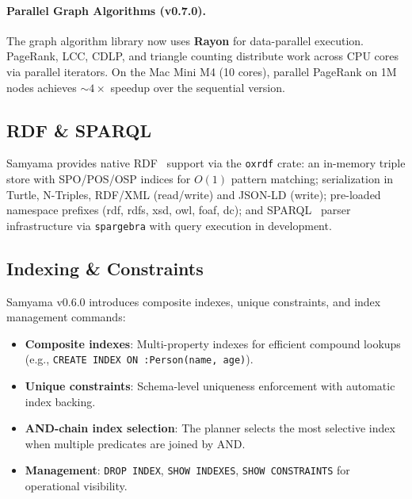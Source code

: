 \documentclass[11pt]{article}
\begin{document}
\paragraph{Parallel Graph Algorithms (v0.7.0).}
The graph algorithm library now uses \textbf{Rayon} for data-parallel execution. PageRank, LCC, CDLP, and triangle counting distribute work across CPU cores via parallel iterators. On the Mac Mini M4 (10 cores), parallel PageRank on 1M nodes achieves ${\sim}4\times$ speedup over the sequential version.

\subsection{RDF \& SPARQL}

Samyama provides native RDF~\citep{w3c2014rdf} support via the \texttt{oxrdf} crate: an in-memory triple store with SPO/POS/OSP indices for $O(1)$ pattern matching; serialization in Turtle, N-Triples, RDF/XML (read/write) and JSON-LD (write); pre-loaded namespace prefixes (rdf, rdfs, xsd, owl, foaf, dc); and SPARQL~\citep{w3c2013sparql} parser infrastructure via \texttt{spargebra} with query execution in development.

\subsection{Indexing \& Constraints}
\label{sec:indexing}

Samyama v0.6.0 introduces composite indexes, unique constraints, and index management commands:

\begin{itemize}[leftmargin=*]
  \item \textbf{Composite indexes}: Multi-property indexes for efficient compound lookups (e.g., \texttt{CREATE INDEX ON :Person(name, age)}).
  \item \textbf{Unique constraints}: Schema-level uniqueness enforcement with automatic index backing.
  \item \textbf{AND-chain index selection}: The planner selects the most selective index when multiple predicates are joined by AND.
  \item \textbf{Management}: \texttt{DROP INDEX}, \texttt{SHOW INDEXES}, \texttt{SHOW CONSTRAINTS} for operational visibility.
\end{itemize}

\end{document}
